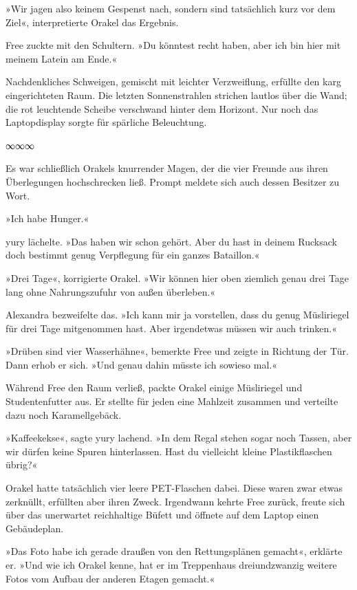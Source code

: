 »Wir jagen also keinem Gespenst nach, sondern sind tatsächlich kurz vor dem Ziel«, interpretierte Orakel das Ergebnis.

Free zuckte mit den Schultern. »Du könntest recht haben, aber ich bin hier mit meinem Latein am Ende.«

Nachdenkliches Schweigen, gemischt mit leichter Verzweiflung, erfüllte den karg eingerichteten Raum. Die letzten Sonnenstrahlen strichen lautlos über die Wand; die rot leuchtende Scheibe verschwand hinter dem Horizont. Nur noch das Laptopdisplay sorgte für spärliche Beleuchtung.

\begin{center}
∞∞∞
\end{center}

Es war schließlich Orakels knurrender Magen, der die vier Freunde aus ihren Überlegungen hochschrecken ließ. Prompt meldete sich auch dessen Besitzer zu Wort.

»Ich habe Hunger.«

yury lächelte. »Das haben wir schon gehört. Aber du hast in deinem Rucksack doch bestimmt genug Verpflegung für ein ganzes Bataillon.«

»Drei Tage«, korrigierte Orakel. »Wir können hier oben ziemlich genau drei Tage lang ohne Nahrungszufuhr von außen überleben.«

Alexandra bezweifelte das. »Ich kann mir ja vorstellen, dass du genug Müsliriegel für drei Tage mitgenommen hast. Aber irgendetwas müssen wir auch trinken.«

»Drüben sind vier Wasserhähne«, bemerkte Free und zeigte in Richtung der Tür. Dann erhob er sich. »Und genau dahin müsste ich sowieso mal.«

Während Free den Raum verließ, packte Orakel einige Müsliriegel und Studentenfutter aus. Er stellte für jeden eine Mahlzeit zusammen und verteilte dazu noch Karamellgebäck.

»Kaffeekekse«, sagte yury lachend. »In dem Regal stehen sogar noch Tassen, aber wir dürfen keine Spuren hinterlassen. Hast du vielleicht kleine Plastikflaschen übrig?«

Orakel hatte tatsächlich vier leere PET-Flaschen dabei. Diese waren zwar etwas zerknüllt, erfüllten aber ihren Zweck. Irgendwann kehrte Free zurück, freute sich über das unerwartet reichhaltige Büfett und öffnete auf dem Laptop einen Gebäudeplan.

»Das Foto habe ich gerade draußen von den Rettungsplänen gemacht«, erklärte er. »Und wie ich Orakel kenne, hat er im Treppenhaus dreiundzwanzig weitere Fotos vom Aufbau der anderen Etagen gemacht.«

